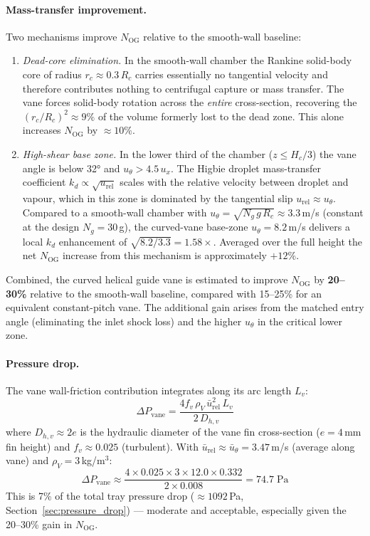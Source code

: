 \documentclass[11pt,letterpaper]{article}
\newcommand{\rhoV}{\rho_V}
\begin{document}
\paragraph{Mass-transfer improvement.}
Two mechanisms improve $N_{\mathrm{OG}}$ relative to the smooth-wall baseline:

\begin{enumerate}[nosep]
  \item \emph{Dead-core elimination.}  In the smooth-wall chamber the
    Rankine solid-body core of radius $r_c \approx 0.3\,R_c$ carries
    essentially no tangential velocity and therefore contributes nothing
    to centrifugal capture or mass transfer.  The vane forces solid-body
    rotation across the \emph{entire} cross-section, recovering the
    $(r_c/R_c)^2 \approx 9\%$ of the volume formerly lost to the dead
    zone.  This alone increases $N_{\mathrm{OG}}$ by $\approx 10$\%.

  \item \emph{High-shear base zone.}  In the lower third of the chamber
    ($z \le H_c/3$) the vane angle is below 32° and $u_\theta > 4.5\,u_x$.
    The Higbie droplet mass-transfer coefficient $k_d \propto \sqrt{u_{\mathrm{rel}}}$
    scales with the relative velocity between droplet and vapour, which
    in this zone is dominated by the tangential slip
    $u_{\mathrm{rel}} \approx u_\theta$.  Compared to a smooth-wall
    chamber with $u_\theta = \sqrt{N_g\,g\,R_c} \approx 3.3$\,m/s
    (constant at the design $N_g = 30$\,g), the curved-vane base-zone
    $u_\theta = 8.2$\,m/s delivers a local $k_d$ enhancement of
    $\sqrt{8.2/3.3} = 1.58\times$.  Averaged over the full height the
    net $N_{\mathrm{OG}}$ increase from this mechanism is approximately
    $+12$\%.
\end{enumerate}

Combined, the curved helical guide vane is estimated to improve
$N_{\mathrm{OG}}$ by \textbf{20--30\%} relative to the smooth-wall
baseline, compared with 15--25\% for an equivalent constant-pitch vane.
The additional gain arises from the matched entry angle (eliminating the
inlet shock loss) and the higher $u_\theta$ in the critical lower zone.

\paragraph{Pressure drop.}
The vane wall-friction contribution integrates along its arc length $L_v$:
\begin{equation}
  \Delta P_{\mathrm{vane}} = \frac{4f_v\,\rhoV\,\bar{u}_{\mathrm{rel}}^2\,L_v}{2\,D_{h,v}}
  \label{eq:dp_vane}
\end{equation}
where $D_{h,v} \approx 2e$ is the hydraulic diameter of the vane fin
cross-section ($e = 4$\,mm fin height) and $f_v \approx 0.025$ (turbulent).
With $\bar{u}_{\mathrm{rel}} \approx \bar{u}_\theta = 3.47$\,m/s
(average along vane) and $\rhoV = 3$\,kg/m$^3$:
\[
  \Delta P_{\mathrm{vane}} \approx \frac{4\times0.025\times3\times12.0\times0.332}{2\times0.008}
  = 74.7\;\text{Pa}
\]
This is 7\% of the total tray pressure drop ($\approx 1092$\,Pa,
Section~\ref{sec:pressure_drop}) — moderate and acceptable, especially
given the 20--30\% gain in $N_{\mathrm{OG}}$.
\end{document}

